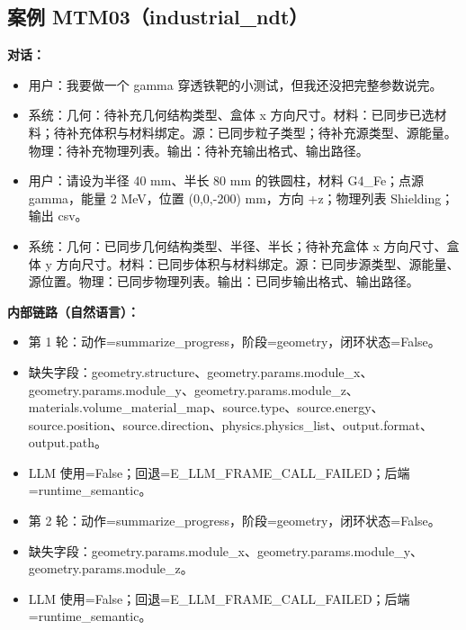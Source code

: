 \documentclass[11pt]{ctexart}
\begin{document}
\subsection{案例 MTM03（industrial\_ndt）}
\textbf{对话：}
\begin{itemize}
\item 用户：我要做一个 gamma 穿透铁靶的小测试，但我还没把完整参数说完。
\item 系统：几何：待补充几何结构类型、盒体 x 方向尺寸。材料：已同步已选材料；待补充体积与材料绑定。源：已同步粒子类型；待补充源类型、源能量。物理：待补充物理列表。输出：待补充输出格式、输出路径。
\item 用户：请设为半径 40 mm、半长 80 mm 的铁圆柱，材料 G4\_Fe；点源 gamma，能量 2 MeV，位置 (0,0,-200) mm，方向 +z；物理列表 Shielding；输出 csv。
\item 系统：几何：已同步几何结构类型、半径、半长；待补充盒体 x 方向尺寸、盒体 y 方向尺寸。材料：已同步体积与材料绑定。源：已同步源类型、源能量、源位置。物理：已同步物理列表。输出：已同步输出格式、输出路径。
\end{itemize}
\textbf{内部链路（自然语言）：}
\begin{itemize}
\item 第 1 轮：动作=summarize\_progress，阶段=geometry，闭环状态=False。
\item 缺失字段：geometry.structure、geometry.params.module\_x、geometry.params.module\_y、geometry.params.module\_z、materials.volume\_material\_map、source.type、source.energy、source.position、source.direction、physics.physics\_list、output.format、output.path。
\item LLM 使用=False；回退=E\_LLM\_FRAME\_CALL\_FAILED；后端=runtime\_semantic。
\item 第 2 轮：动作=summarize\_progress，阶段=geometry，闭环状态=False。
\item 缺失字段：geometry.params.module\_x、geometry.params.module\_y、geometry.params.module\_z。
\item LLM 使用=False；回退=E\_LLM\_FRAME\_CALL\_FAILED；后端=runtime\_semantic。
\end{itemize}
\end{document}
